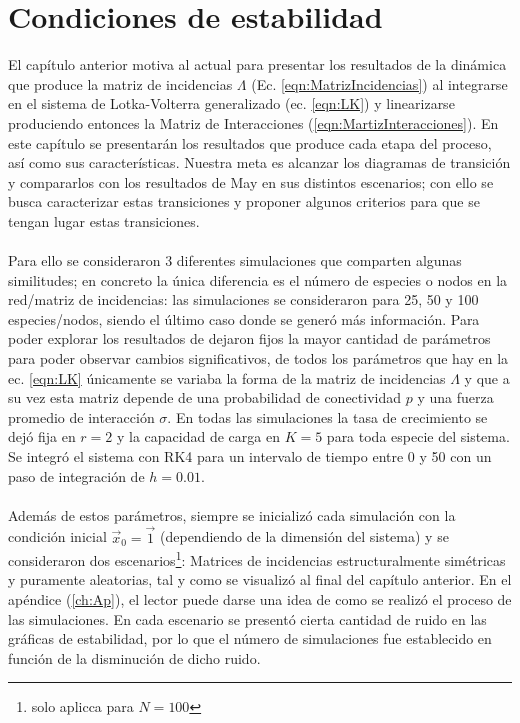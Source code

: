 \chapter{Condiciones de estabilidad}

El capítulo anterior motiva al actual para presentar los resultados de la dinámica que produce la matriz de incidencias $\Lambda$ (Ec. \ref{eqn:MatrizIncidencias}) al integrarse en el sistema de Lotka-Volterra generalizado (ec. \ref{eqn:LK}) y linearizarse produciendo entonces la Matriz de Interacciones (\ref{eqn:MartizInteracciones}). En este capítulo se presentarán los resultados que produce cada etapa del proceso, así como sus características. Nuestra meta es alcanzar los diagramas de transición y compararlos con los resultados de May en sus distintos escenarios; con ello se busca caracterizar estas transiciones y proponer algunos criterios para que se tengan lugar estas transiciones.\\
\\
Para ello se consideraron 3 diferentes simulaciones que comparten algunas similitudes; en concreto la única diferencia es el número de especies o nodos en la red/matriz de incidencias: las simulaciones se consideraron para 25, 50 y 100 especies/nodos, siendo el último caso donde se generó más información. Para poder explorar los resultados de dejaron fijos la mayor cantidad de parámetros para poder observar cambios significativos, de todos los parámetros que hay en la ec. \ref{eqn:LK} únicamente se variaba la forma de la matriz de incidencias $\Lambda$ y que a su vez esta matriz depende de una probabilidad de conectividad $p$ y una fuerza promedio de interacción $\sigma$. En todas las simulaciones la tasa de crecimiento se dejó fija en $r=2$ y la capacidad de carga en $K=5$ para toda especie del sistema. Se integró el sistema con RK4 para un intervalo de tiempo entre 0 y 50 con un paso de integración de $h=0.01$.\\
\\
Además de estos parámetros, siempre se inicializó cada simulación con la condición inicial $\vec{x}_0=\vec{1}$ (dependiendo de la dimensión del sistema) y se consideraron dos escenarios\footnote{solo aplicca para $N=100$}: Matrices de incidencias estructuralmente simétricas y puramente aleatorias, tal y como se visualizó al final del capítulo anterior. En el apéndice (\ref{ch:Ap}), el lector puede darse una idea de como se realizó el proceso de las simulaciones. En cada escenario se presentó cierta cantidad de ruido en las gráficas de estabilidad, por lo que el número de simulaciones fue establecido en función de la disminución de dicho ruido.

